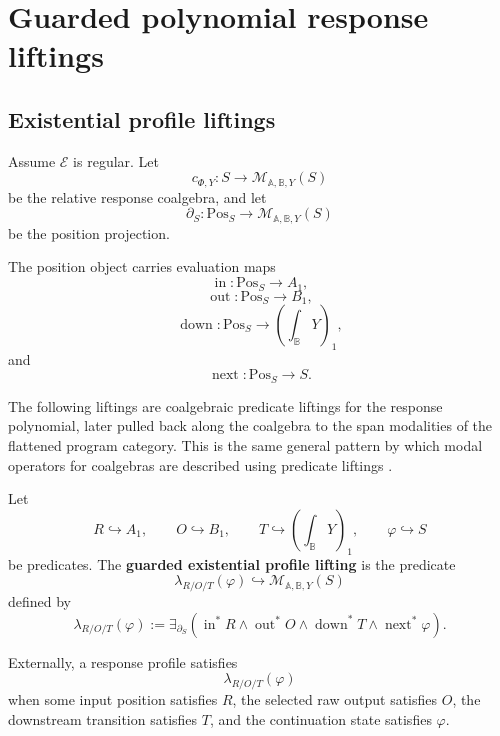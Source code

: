 \section{Guarded polynomial response liftings}
\label{sec:poly-relative-guarded-response-liftings}

\subsection{Existential profile liftings}
\label{subsec:poly-relative-existential-profile-liftings}

Assume \(\mathcal E\) is regular.  Let
\[
c_{\Phi,Y}:
S\to\mathcal M_{\mathbb A,\mathbb B,Y}(S)
\]
be the relative response coalgebra, and let
\[
\partial_S:\mathrm{Pos}_S\to\mathcal M_{\mathbb A,\mathbb B,Y}(S)
\]
be the position projection.

The position object carries evaluation maps
\[
\operatorname{in}:\mathrm{Pos}_S\to A_1,
\]
\[
\operatorname{out}:\mathrm{Pos}_S\to B_1,
\]
\[
\operatorname{down}:\mathrm{Pos}_S\to
\left(\int_{\mathbb B}Y\right)_1,
\]
and
\[
\operatorname{next}:\mathrm{Pos}_S\to S.
\]

The following liftings are coalgebraic predicate liftings for the response
polynomial, later pulled back along the coalgebra to the span modalities of
the flattened program category.  This is the same general pattern by which
modal operators for coalgebras are described using predicate liftings
\cite{Pattinson2003CoalgebraicModalLogic}.

\begin{definition}
\label{def:poly-relative-guarded-existential-lifting}
Let
\[
R\hookrightarrow A_1,
\qquad
O\hookrightarrow B_1,
\qquad
T\hookrightarrow\left(\int_{\mathbb B}Y\right)_1,
\qquad
\varphi\hookrightarrow S
\]
be predicates.  The \textbf{guarded existential profile lifting} is the
predicate
\[
\lambda_{R/O/T}(\varphi)
\hookrightarrow
\mathcal M_{\mathbb A,\mathbb B,Y}(S)
\]
defined by
\[
\lambda_{R/O/T}(\varphi)
:=
\exists_{\partial_S}
\left(
\operatorname{in}^{\ast}R
\wedge
\operatorname{out}^{\ast}O
\wedge
\operatorname{down}^{\ast}T
\wedge
\operatorname{next}^{\ast}\varphi
\right).
\]
\end{definition}

Externally, a response profile satisfies
\[
\lambda_{R/O/T}(\varphi)
\]
when some input position satisfies \(R\), the selected raw output satisfies
\(O\), the downstream transition satisfies \(T\), and the continuation state
satisfies \(\varphi\).

